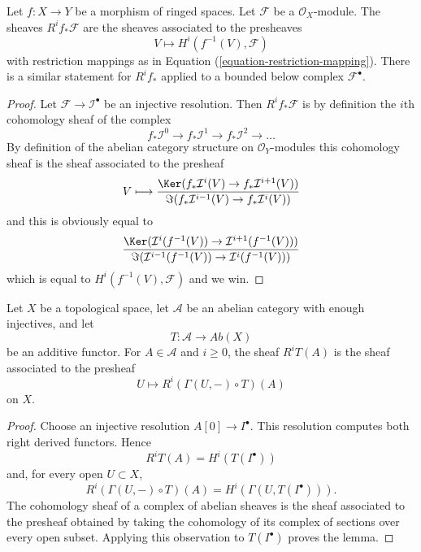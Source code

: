 \begin{lemma}
\label{lemma-describe-higher-direct-images}
Let $f : X \to Y$ be a morphism of ringed spaces.
Let $\mathcal{F}$ be a $\mathcal{O}_X$-module.
The sheaves $R^if_*\mathcal{F}$ are the sheaves
associated to the presheaves
$$
V \longmapsto H^i(f^{-1}(V), \mathcal{F})
$$
with restriction mappings as in Equation (\ref{equation-restriction-mapping}).
There is a similar statement for $R^if_*$ applied to a
bounded below complex $\mathcal{F}^\bullet$.
\end{lemma}

\begin{proof}
Let $\mathcal{F} \to \mathcal{I}^\bullet$ be an injective resolution.
Then $R^if_*\mathcal{F}$ is by definition the $i$th cohomology sheaf
of the complex
$$
f_*\mathcal{I}^0 \to f_*\mathcal{I}^1 \to f_*\mathcal{I}^2 \to \ldots
$$
By definition of the abelian category structure on $\mathcal{O}_Y$-modules
this cohomology sheaf is the sheaf associated to the presheaf
$$
V
\longmapsto
\frac{\Ker(f_*\mathcal{I}^i(V) \to f_*\mathcal{I}^{i + 1}(V))}
{\Im(f_*\mathcal{I}^{i - 1}(V) \to f_*\mathcal{I}^i(V))}
$$
and this is obviously equal to
$$
\frac{\Ker(\mathcal{I}^i(f^{-1}(V)) \to \mathcal{I}^{i + 1}(f^{-1}(V)))}
{\Im(\mathcal{I}^{i - 1}(f^{-1}(V)) \to \mathcal{I}^i(f^{-1}(V)))}
$$
which is equal to $H^i(f^{-1}(V), \mathcal{F})$
and we win.
\end{proof}

\begin{lemma}
\label{lemma-derived-functor-sheafification}
\begin{reference}
\cite[Chapter III, \S 3.7, Lemma 3.7.2, p. 173]{Tohoku}
\end{reference}
Let $X$ be a topological space, let $\mathcal{A}$ be an abelian category
with enough injectives, and let
$$
T : \mathcal{A} \longrightarrow \textit{Ab}(X)
$$
be an additive functor. For $A \in \mathcal{A}$ and $i \geq 0$, the
sheaf $R^iT(A)$ is the sheaf associated to the presheaf
$$
U \longmapsto R^i(\Gamma(U, -) \circ T)(A)
$$
on $X$.
\end{lemma}

\begin{proof}
Choose an injective resolution $A[0] \to I^\bullet$. This resolution
computes both right derived functors. Hence
$$
R^iT(A) = H^i(T(I^\bullet))
$$
and, for every open $U \subset X$,
$$
R^i(\Gamma(U, -) \circ T)(A)
= H^i(\Gamma(U, T(I^\bullet))).
$$
The cohomology sheaf of a complex of abelian sheaves is the sheaf
associated to the presheaf obtained by taking the cohomology of its
complex of sections over every open subset. Applying this observation to
$T(I^\bullet)$ proves the lemma.
\end{proof}

